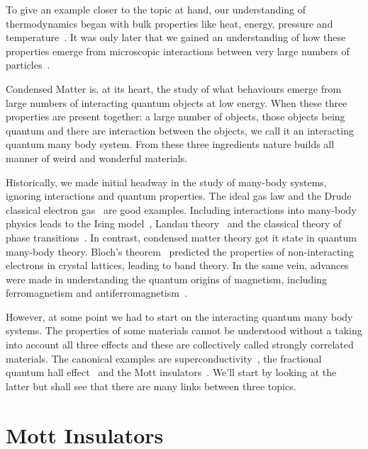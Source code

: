 To give an example closer to the topic at hand, our understanding of thermodynamics began with bulk properties like heat, energy, pressure and temperature~\autocite{saslowHistoryThermodynamicsMissing2020}. It was only later that we gained an understanding of how these properties emerge from microscopic interactions between very large numbers of particles~\autocite{flammHistoryOutlookStatistical1998}.

Condensed Matter is, at its heart, the study of what behaviours emerge from large numbers of interacting quantum objects at low energy. When these three properties are present together: a large number of objects, those objects being quantum and there are interaction between the objects, we call it an interacting quantum many body system. From these three ingredients nature builds all manner of weird and wonderful materials.

Historically, we made initial headway in the study of many-body systems, ignoring interactions and quantum properties. The ideal gas law and the Drude classical electron gas~\autocite{ashcroftSolidStatePhysics1976} are good examples. Including interactions into many-body physics leads to the Ising model~\autocite{isingBeitragZurTheorie1925}, Landau theory~\autocite{landau2013fluid} and the classical theory of phase transitions~\autocite{jaegerEhrenfestClassificationPhase1998}. In contrast, condensed matter theory got it state in quantum many-body theory. Bloch's theorem~\autocite{blochÜberQuantenmechanikElektronen1929} predicted the properties of non-interacting electrons in crystal lattices, leading to band theory. In the same vein, advances were made in understanding the quantum origins of magnetism, including ferromagnetism and antiferromagnetism~\autocite{MagnetismCondensedMatter}.

However, at some point we had to start on the interacting quantum many body systems. The properties of some materials cannot be understood without a taking into account all three effects and these are collectively called strongly correlated materials. The canonical examples are superconductivity~\autocite{MicroscopicTheorySuperconductivity}, the fractional quantum hall effect~\autocite{feldmanFractionalChargeFractional2021} and the Mott insulators~\autocite{mottBasisElectronTheory1949,fisherMottInsulatorsSpin1999}. We'll start by looking at the latter but shall see that there are many links between three topics.

\hypertarget{mott-insulators}{%
\section{Mott Insulators}\label{mott-insulators}}

